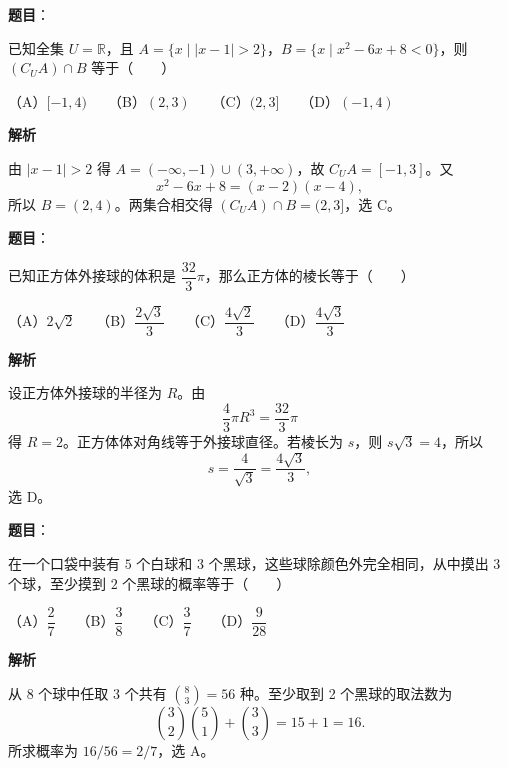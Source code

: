 \begin{answer}

\textbf{题目}：

已知全集 $U=\mathbb R$，且 $A=\{x\mid |x-1|>2\}$，$B=\{x\mid x^2-6x+8<0\}$，则 $(C_U A)\cap B$ 等于\mbox{（　　）}

（A）$[-1,4)$　　（B）$(2,3)$　　（C）$(2,3]$　　（D）$(-1,4)$

\textbf{解析}

由 $|x-1|>2$ 得 $A=(-\infty,-1)\cup(3,+\infty)$，故 $C_UA=[-1,3]$。又
\nopagebreak[4]
\[
x^2-6x+8=(x-2)(x-4),
\]
所以 $B=(2,4)$。两集合相交得 $(C_UA)\cap B=(2,3]$，选 C。

\gkanswer{答案：C，$(2,3]$}

\end{answer}
\begin{answer}

\textbf{题目}：

已知正方体外接球的体积是 $\dfrac{32}{3}\pi$，那么正方体的棱长等于\mbox{（　　）}

（A）$2\sqrt2$　　（B）$\dfrac{2\sqrt3}{3}$　　（C）$\dfrac{4\sqrt2}{3}$　　（D）$\dfrac{4\sqrt3}{3}$

\textbf{解析}

设正方体外接球的半径为 $R$。由
\nopagebreak[4]
\[
\frac43\pi R^3=\frac{32}3\pi
\]
得 $R=2$。正方体体对角线等于外接球直径。若棱长为 $s$，则 $s\sqrt3=4$，所以
\nopagebreak[4]
\[
s=\frac4{\sqrt3}=\frac{4\sqrt3}{3},
\]
选 D。


\end{answer}
\begin{answer}

\textbf{题目}：

在一个口袋中装有 $5$ 个白球和 $3$ 个黑球，这些球除颜色外完全相同，从中摸出 $3$ 个球，至少摸到 $2$ 个黑球的概率等于\mbox{（　　）}

（A）$\dfrac27$　　（B）$\dfrac38$　　（C）$\dfrac37$　　（D）$\dfrac9{28}$

\textbf{解析}

从 8 个球中任取 3 个共有 $\binom83=56$ 种。至少取到 2 个黑球的取法数为
\nopagebreak[4]
\[
\binom32\binom51+\binom33=15+1=16.
\]
所求概率为 $16/56=2/7$，选 A。


\end{answer}
